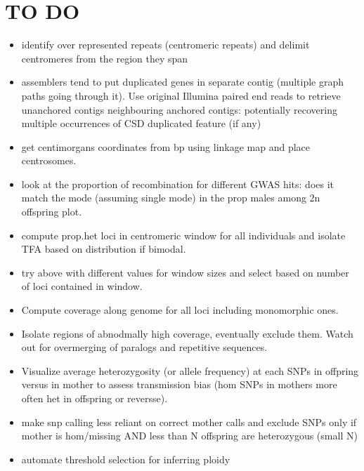 \documentclass[10pt,a4paper]{report}
\begin{document}
\chapter{TO DO}
\begin{itemize}
\item identify over represented repeats (centromeric repeats) and delimit centromeres from the region they span
\item assemblers tend to put duplicated genes in separate contig (multiple graph paths going through it). Use original Illumina paired end reads to retrieve unanchored contigs neighbouring anchored contigs: potentially recovering multiple occurrences of CSD duplicated feature (if any)
\item get centimorgans coordinates from bp using linkage map and place centrosomes.
\item look at the proportion of recombination for different GWAS hits: does it match the mode (assuming single mode) in the prop males among 2n offspring plot.
\item compute prop.het loci in centromeric window for all individuals and isolate TFA based on distribution if bimodal.
\item try above with different values for window sizes and select based on number of loci contained in window.
\item Compute coverage along genome for all loci including monomorphic ones.
\item Isolate regions of abnodmally high coverage, eventually exclude them. Watch out for overmerging of paralogs and repetitive sequences.
\item Visualize average heterozygosity (or allele frequency) at each SNPs in offpring versus in mother to assess transmission bias (hom SNPs in mothers more often het in offspring or reversse). 
\item make snp calling less reliant on correct mother calls and exclude SNPs only if mother is hom/missing AND less than N offspring are heterozygous (small N)
\item automate threshold selection for inferring ploidy
\end{itemize}
\end{document}

